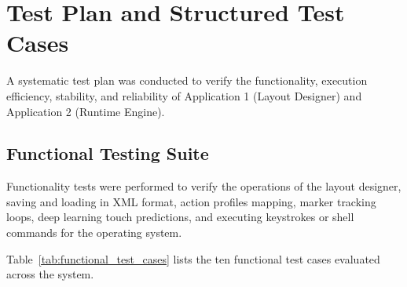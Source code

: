 \section{Test Plan and Structured Test Cases}
\label{sec:test_plan_cases}
A systematic test plan was conducted to verify the functionality, execution efficiency, stability, and reliability of Application 1 (Layout Designer) and Application 2 (Runtime Engine).

\subsection{Functional Testing Suite}
\label{subsec:test_functional}
Functionality tests were performed to verify the operations of the layout designer, saving and loading in XML format, action profiles mapping, marker tracking loops, deep learning touch predictions, and executing keystrokes or shell commands for the operating system.

Table~\ref{tab:functional_test_cases} lists the ten functional test cases evaluated across the system.

